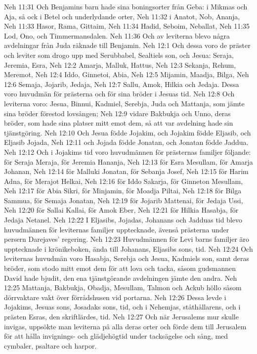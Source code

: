 Neh 11:31  Och Benjamins barn hade sina boningsorter från Geba: i Mikmas och Aja, så ock i Betel och underlydande orter,
Neh 11:32  i Anatot, Nob, Ananja,
Neh 11:33  Hasor, Rama, Gittaim,
Neh 11:34  Hadid, Seboim, Neballat,
Neh 11:35  Lod, Ono, och Timmermansdalen.
Neh 11:36  Och av leviterna blevo några avdelningar från Juda räknade till Benjamin.
Neh 12:1  Och dessa voro de präster och leviter som drogo upp med Serubbabel, Sealtiels son, och Jesua: Seraja, Jeremia, Esra,
Neh 12:2  Amarja, Malluk, Hattus,
Neh 12:3  Sekanja, Rehum, Meremot,
Neh 12:4  Iddo, Ginnetoi, Abia,
Neh 12:5  Mijamin, Maadja, Bilga,
Neh 12:6  Semaja, Jojarib, Jedaja,
Neh 12:7  Sallu, Amok, Hilkia och Jedaja. Dessa voro huvudmän för prästerna och för sina bröder i Jesuas tid.
Neh 12:8  Och leviterna voro: Jesua, Binnui, Kadmiel, Serebja, Juda och Mattanja, som jämte sina bröder förestod lovsången;
Neh 12:9  vidare Bakbukja och Unno, deras bröder, som hade sina platser mitt emot dem, så att var avdelning hade sin tjänstgöring.
Neh 12:10  Och Jesua födde Jojakim, och Jojakim födde Eljasib, och Eljasib Jojada,
Neh 12:11  och Jojada födde Jonatan, och Jonatan födde Jaddua.
Neh 12:12  Och i Jojakims tid voro huvudmännen för prästernas familjer följande: för Seraja Meraja, för Jeremia Hananja,
Neh 12:13  för Esra Mesullam, för Amarja Johanan,
Neh 12:14  för Malluki Jonatan, för Sebanja Josef,
Neh 12:15  för Harim Adna, för Merajot Helkai,
Neh 12:16  för Iddo Sakarja, för Ginneton Mesullam,
Neh 12:17  för Abia Sikri, för Minjamin, för Moadja Piltai,
Neh 12:18  för Bilga Sammua, för Semaja Jonatan,
Neh 12:19  för Jojarib Mattenai, för Jedaja Ussi,
Neh 12:20  för Sallai Kallai, för Amok Eber,
Neh 12:21  för Hilkia Hasabja, för Jedaja Netanel.
Neh 12:22  I Eljasibs, Jojadas, Johanans och Jadduas tid blevo huvudmännen för leviternas familjer upptecknade, ävenså prästerna under persern Darejaves' regering.
Neh 12:23  Huvudmännen för Levi barns familjer äro upptecknade i krönikeboken, ända till Johanans, Eljasibs sons, tid.
Neh 12:24  Och leviternas huvudmän voro Hasabja, Serebja och Jesua, Kadmiels son, samt deras bröder, som stodo mitt emot dem för att lova och tacka, såsom gudsmannen David hade bjudit, den ena tjänstgörande avdelningen jämte den andra.
Neh 12:25  Mattanja, Bakbukja, Obadja, Mesullam, Talmon och Ackub höllo såsom dörrvaktare vakt över förrådshusen vid portarna.
Neh 12:26  Dessa levde i Jojakims, Jesuas sons, Josadaks sons, tid, och i Nehemjas, ståthållarens, och i prästen Esras, den skriftlärdes, tid.
Neh 12:27  Och när Jerusalems mur skulle invigas, uppsökte man leviterna på alla deras orter och förde dem till Jerusalem för att hålla invignings- och glädjehögtid under tacksägelse och sång, med cymbaler, psaltare och harpor.
